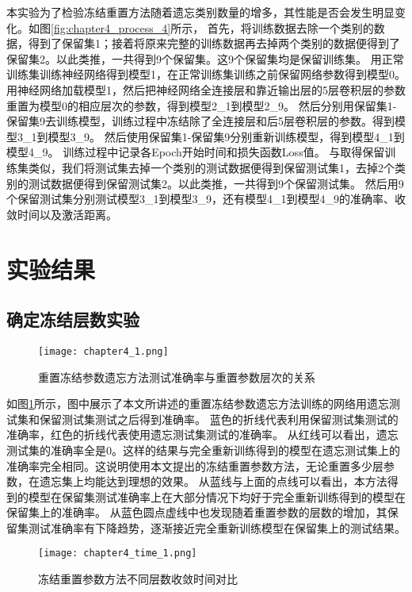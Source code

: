 本实验为了检验冻结重置方法随着遗忘类别数量的增多，其性能是否会发生明显变化。如图\ref{fig:chapter4_process_4}所示，
首先，将训练数据去除一个类别的数据，得到了保留集1；接着将原来完整的训练数据再去掉两个类别的数据便得到了保留集2。以此类推，一共得到9个保留集。这9个保留集均是保留训练集。
用正常训练集训练神经网络得到模型1，在正常训练集训练之前保留网络参数得到模型0。
用神经网络加载模型1，然后把神经网络全连接层和靠近输出层的5层卷积层的参数重置为模型0的相应层次的参数，得到模型2\_1到模型2\_9。
然后分别用保留集1-保留集9去训练模型，训练过程中冻结除了全连接层和后5层卷积层的参数。得到模型3\_1到模型3\_9。
然后使用保留集1-保留集9分别重新训练模型，得到模型4\_1到模型4\_9。
训练过程中记录各Epoch开始时间和损失函数Loss值。
与取得保留训练集类似，我们将测试集去掉一个类别的测试数据便得到保留测试集1，去掉2个类别的测试数据便得到保留测试集2。以此类推，一共得到9个保留测试集。
然后用9个保留测试集分别测试模型3\_1到模型3\_9，还有模型4\_1到模型4\_9的准确率、收敛时间以及激活距离。

\section{实验结果}
\subsection{确定冻结层数实验}
\begin{figure}
    \centering
    \texttt{[image: chapter4\_1.png]}
    \caption{重置冻结参数遗忘方法测试准确率与重置参数层次的关系}
    \label{fig:chapter4_1}
\end{figure}

如图\ref{fig:chapter4_1}所示，图中展示了本文所讲述的重置冻结参数遗忘方法训练的网络用遗忘测试集和保留测试集测试之后得到准确率。
蓝色的折线代表利用保留测试集测试的准确率，红色的折线代表使用遗忘测试集测试的准确率。
从红线可以看出，遗忘测试集的准确率全是0。这样的结果与完全重新训练得到的模型在遗忘测试集上的准确率完全相同。这说明使用本文提出的冻结重置参数方法，无论重置多少层参数，在遗忘集上均能达到理想的效果。
从蓝线与上面的点线可以看出，本方法得到的模型在保留集测试准确率上在大部分情况下均好于完全重新训练得到的模型在保留集上的准确率。
从蓝色圆点虚线中也发现随着重置参数的层数的增加，其保留集测试准确率有下降趋势，逐渐接近完全重新训练模型在保留集上的测试结果。

\begin{figure}
    \centering
    \texttt{[image: chapter4\_time\_1.png]}
    \caption{冻结重置参数方法不同层数收敛时间对比}
    \label{fig:chapter4_time_1}
\end{figure}

